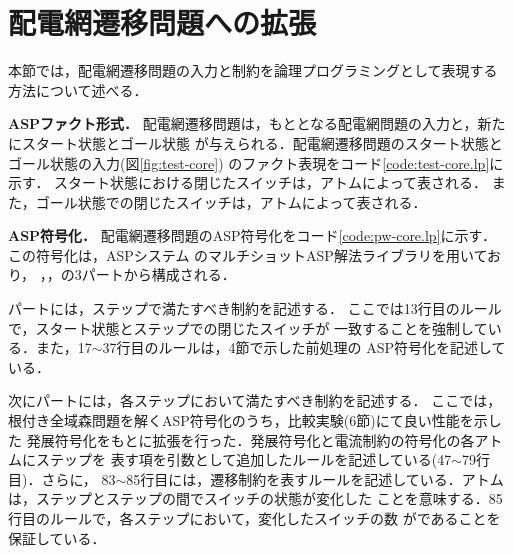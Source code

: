 \section{配電網遷移問題への拡張}\label{chap:core}

本節では，配電網遷移問題の入力と制約を論理プログラミングとして表現する
方法について述べる．





\textbf{ASPファクト形式．}
配電網遷移問題は，もととなる配電網問題の入力と，新たにスタート状態とゴール状態
が与えられる．配電網遷移問題のスタート状態とゴール状態の入力(図\ref{fig:test-core})
のファクト表現をコード\ref{code:test-core.lp}に示す．
スタート状態における閉じたスイッチは，アトムによって表される．
また，ゴール状態での閉じたスイッチは，アトムによって表される．

\textbf{ASP符号化．}
配電網遷移問題のASP符号化をコード\ref{code:pw-core.lp}に示す．
この符号化は，ASPシステム \clingo のマルチショットASP解法ライブラリを用いており，
，，の3パートから構成される．

パートには，ステップで満たすべき制約を記述する．
ここでは13行目のルールで，スタート状態とステップでの閉じたスイッチが
一致することを強制している．また，17$\sim$37行目のルールは，4節で示した前処理の
ASP符号化を記述している．

次にパートには，各ステップにおいて満たすべき制約を記述する．
ここでは，根付き全域森問題を解くASP符号化のうち，比較実験(6節)にて良い性能を示した
発展符号化をもとに拡張を行った．発展符号化と電流制約の符号化の各アトムにステップを
表す項を引数として追加したルールを記述している(47$\sim$79行目)．さらに，
83$\sim$85行目には，遷移制約を表すルールを記述している．アトム
は，ステップとステップの間でスイッチの状態が変化した
ことを意味する．85行目のルールで，各ステップにおいて，変化したスイッチの数
がであることを保証している．

